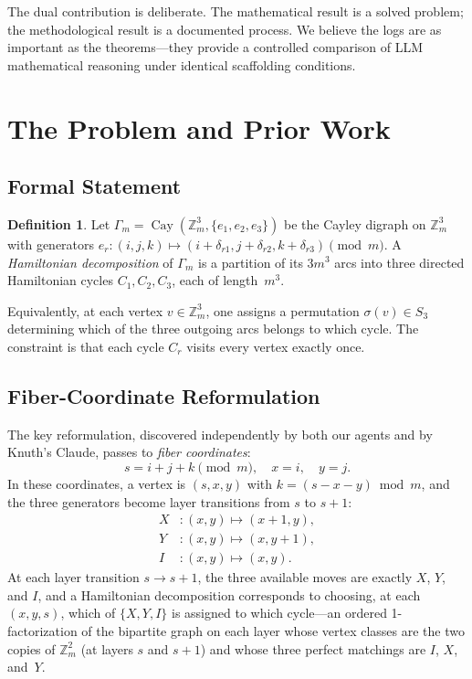 \documentclass[11pt]{article}
\theoremstyle{definition}
\newtheorem{definition}[theorem]{Definition}
\theoremstyle{remark}
\newcommand{\Zm}{\mathbb{Z}_m}
\newcommand{\Cay}{\operatorname{Cay}}
\begin{document}
The dual contribution is deliberate. The mathematical result is a solved problem; the methodological result is a documented process. We believe the logs are as important as the theorems---they provide a controlled comparison of LLM mathematical reasoning under identical scaffolding conditions.

\section{The Problem and Prior Work}
\label{sec:problem}

\subsection{Formal Statement}

\begin{definition}
Let $\Gamma_m = \Cay(\Zm^3, \{e_1, e_2, e_3\})$ be the Cayley digraph on $\Zm^3$ with generators $e_r : (i,j,k) \mapsto (i + \delta_{r1}, j + \delta_{r2}, k + \delta_{r3}) \pmod{m}$. A \emph{Hamiltonian decomposition} of $\Gamma_m$ is a partition of its $3m^3$ arcs into three directed Hamiltonian cycles $C_1, C_2, C_3$, each of length~$m^3$.
\end{definition}

Equivalently, at each vertex $v \in \Zm^3$, one assigns a permutation $\sigma(v) \in S_3$ determining which of the three outgoing arcs belongs to which cycle. The constraint is that each cycle $C_r$ visits every vertex exactly once.

\subsection{Fiber-Coordinate Reformulation}

The key reformulation, discovered independently by both our agents and by Knuth's Claude, passes to \emph{fiber coordinates}:
\begin{equation}
    s = i + j + k \pmod{m}, \quad x = i, \quad y = j.
\end{equation}
In these coordinates, a vertex is $(s, x, y)$ with $k = (s - x - y) \bmod m$, and the three generators become layer transitions from $s$ to $s+1$:
\begin{align}
    X &: (x, y) \mapsto (x+1, y), \\
    Y &: (x, y) \mapsto (x, y+1), \\
    I &: (x, y) \mapsto (x, y).
\end{align}
At each layer transition $s \to s+1$, the three available moves are exactly $X$, $Y$, and $I$, and a Hamiltonian decomposition corresponds to choosing, at each $(x, y, s)$, which of $\{X, Y, I\}$ is assigned to which cycle---an ordered 1-factorization of the bipartite graph on each layer whose vertex classes are the two copies of $\Zm^2$ (at layers $s$ and $s+1$) and whose three perfect matchings are $I$, $X$, and~$Y$.
\end{document}
